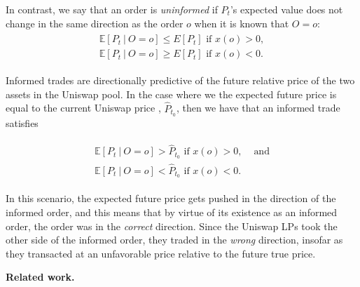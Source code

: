         In contrast, we say that an order is \textit{uninformed} if $P_t$'s expected value does not change in the same direction as the order $o$ when it is known that $O=o$:
        \begin{align}
            \begin{split}
                \mathbb E [P_t \ | \ O=o] \leq E[P_t] \text{ if } x(o) > 0, \\
                \mathbb E [P_t \ | \ O=o] \geq E[P_t] \text{ if } x(o) < 0.    
            \end{split}
        \end{align}

        Informed trades are directionally predictive of the future relative price of the two assets in the Uniswap pool. In the case where we  the expected future price is equal to the current Uniswap price 
        , $\hat P_{t_0}$, then we have that an informed trade satisfies

        \begin{align*}
            \begin{split}
                \mathbb E [P_t \ | \ O=o] > \hat P_{t_0} \text{ if } x(o) > 0, & \text{ and} \\
                \mathbb E [P_t \ | \ O=o] < \hat P_{t_0} \text{ if } x(o) < 0.    
            \end{split}
        \end{align*}

        In this scenario, the expected future price gets pushed in the direction of the informed order, and this means that by virtue of its existence as an informed order, the order was in the \textit{correct} direction. Since the Uniswap LPs took the other side of the informed order, they traded in the \textit{wrong} direction, insofar as they transacted at an unfavorable price relative to the future true price.




    \textbf{Related work.}
    
